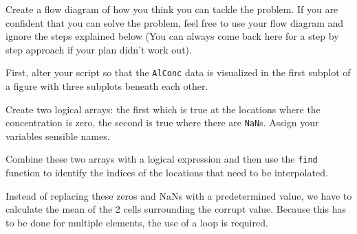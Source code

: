 Create a flow diagram of how you think you can tackle the problem. If you are confident that you can solve the problem, feel free to use your flow diagram and ignore the steps explained below (You can always come back here for a step by step approach if your plan didn't work out). 
\begin{action}
First, alter your script so that the {\tt AlConc} data is visualized in the first subplot of a figure with three subplots beneath each other.
\end{action}
\begin{action}
Create two logical arrays: the first which is true at the locations where the concentration is zero, the second is true where there are {\tt NaN}s. Assign your variables sensible names.
\end{action}
\begin{action}
Combine these two arrays with a logical expression and then use the {\tt find} function to identify the indices of the locations that need to be interpolated.
\end{action}

Instead of replacing these zeros and NaNs with a predetermined value, we have to calculate the mean of the 2 cells surrounding the corrupt value. Because this has to be done for multiple elements, the use of a loop is required.

